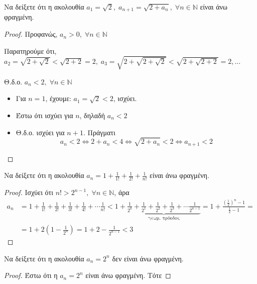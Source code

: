 \begin{enumerate}
  \item Να δείξετε ότι η ακολουθία $ a_{1} = \sqrt{2}, \; a_{n+1} =
    \sqrt{2+ a_{n}}, \; \forall n \in \mathbb{N} $ είναι άνω φραγμένη.
    \begin{proof}
    \item {}
      Προφανώς, $ a_{n} > 0, \; \forall n \in \mathbb{N} $ 

      Παρατηρούμε ότι, $ a_{2}= \sqrt{2 + \sqrt{2}} < \sqrt{2+2} =2, \; 
      a_{3}= \sqrt{2+ \sqrt{2 + \sqrt{2}}} < \sqrt{2+ \sqrt{2+2}} = 2, 
      \ldots $ 

      Θ.δ.ο. $ a_{n} < 2, \; \forall n \in \mathbb{N} $ 
      \begin{itemize}
        \item Για $ n=1 $, έχουμε: $ a_{1}= \sqrt{2} < 2 $, ισχύει.
        \item Έστω ότι ισχύει για $n$, δηλαδή $ a_{n} < 2 $
        \item Θ.δ.ο. ισχύει για $ n+1 $. Πράγματι
          \[
            a_{n}<2 \Leftrightarrow 2+a_{n} < 4 \Leftrightarrow 
            \sqrt{2+ a_{n}} < 2\Leftrightarrow a_{n+1} <2
          \] 
      \end{itemize}
    \end{proof}


  \item Να δείξετε ότι η ακολουθία $ a_{n} = 1 + \frac{1}{1!} +
    \frac{1}{2!} + \frac{1}{n!} $ είναι άνω φραγμένη.
    \begin{proof}
    \item {} 
      Ισχύει ότι $ n! > 2^{n-1}, \; \forall n \in \mathbb{N} $, άρα 
      \begin{align*}
        a_{n} &= 1 + \frac{1}{1!} + \frac{1}{2!} + \frac{1}{3!} + 
        \frac{1}{4!} + \cdots \frac{1}{n!} < 1 + 
        \underbrace{\frac{1}{2^{0}} 
          + \frac{1}{2^{1}} + \frac{1}{2^{2}} + \frac{1}{2^{3}} 
        + \cdots \frac{1}{2^{n-1}}}_ {\text{γεωμ. πρόοδος}} = 
        1 + \frac{\left(\frac{1}{2}\right)^{n}-1}{\frac{1}{2} -1} =\\ 
              &= 1 + 2\left(1- \frac{1}{2^{n}}\right) = 1+2- 
              \frac{1}{2^{n-1}} < 3 
      \end{align*} 
    \end{proof}

  \item Να δείξετε ότι η ακολουθία $ a_{n} = 2^{n} $ δεν είναι άνω 
    φραγμένη.
    \begin{proof}
    \item {} 
      Έστω ότι η $ a_{n}=2^{n} $ είναι άνω φραγμένη. Τότε 


\end{proof}
\end{enumerate}
